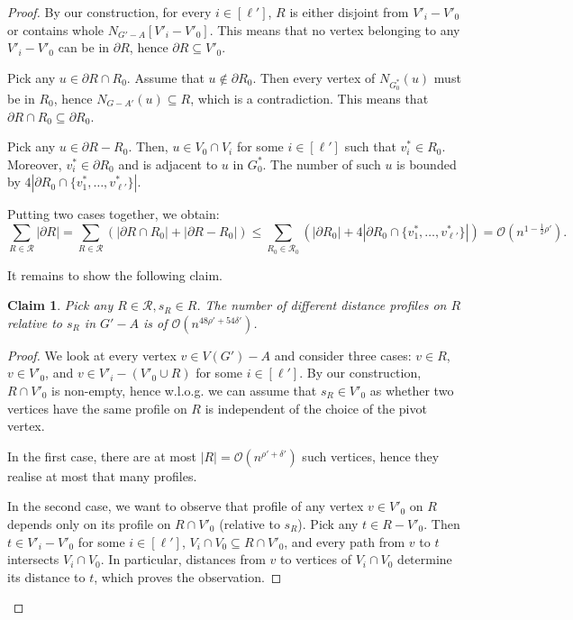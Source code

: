 \documentclass[11pt,a4paper]{article}
\newtheorem{claim}{Claim}[section]
\newcommand{\Oh}{\mathcal{O}}
\renewcommand{\leq}{\leqslant}
\renewcommand{\setminus}{-}
\begin{document}
\begin{proof}
By our construction, for every $i \in [\ell']$, $R$ is either disjoint from $V'_i - V'_0$ or contains whole $N_{G' - A}[V'_i - V'_0]$. This means that no vertex belonging to any $V'_i - V'_0$ can be in $\partial R$, hence $\partial R \subseteq V'_0$.

Pick any $u \in \partial R \cap R_0$. Assume that $u \not\in \partial R_0$. Then every vertex of $N_{G_0^*}(u)$ must be in $R_0$, hence $N_{G - A'}(u) \subseteq R$, which is a contradiction. This means that $\partial R \cap R_0 \subseteq \partial R_0$.

Pick any $u \in \partial R - R_0$. Then, $u \in V_0 \cap V_i$ for some $i \in [\ell']$ such that $v_i^* \in R_0$. Moreover, $v_i^* \in \partial R_0$ and is adjacent to $u$ in $G_0^*$. The number of such $u$ is bounded by $4 |\partial R_0 \cap \{ v_1^*, \dots, v_{\ell'}^* \}|$.

Putting two cases together, we obtain:
$$
\sum_{R \in \mathcal{R}} |\partial R| = \sum_{R \in \mathcal{R}} \left(|\partial R \cap R_0| + |\partial R - R_0|\right) \leq \sum_{R_0 \in \mathcal{R}_0} \left(|\partial R_0| + 4 |\partial R_0 \cap \{ v_1^*, \dots, v_{\ell'}^* \}|\right) = \Oh(n^{1 - \frac{1}{2}\rho'}).
$$

It remains to show the following claim.

\begin{claim}
Pick any $R \in \mathcal{R}, s_R \in R$. The number of different distance profiles on $R$ relative to $s_R$ in $G' - A$ is of $\Oh(n^{48\rho' + 54\delta'})$.
\end{claim}
\begin{proof}
We look at every vertex $v \in V(G') \setminus A$ and consider three cases: $v \in R$, $v \in V'_0$, and $v \in V'_i \setminus (V'_0 \cup R)$ for some $i \in [\ell']$. By our construction, $R \cap V'_0$ is non-empty, hence w.l.o.g. we can assume that $s_R \in V'_0$ as whether two vertices have the same profile on $R$ is independent of the choice of the pivot vertex.

In the first case, there are at most $|R| = \Oh(n^{\rho' + \delta'})$ such vertices, hence they realise at most that many profiles.

In the second case, we want to observe that profile of any vertex $v \in V'_0$ on $R$ depends only on its profile on $R \cap V'_0$ (relative to $s_R$). Pick any $t \in R - V'_0$. Then $t \in V'_i - V'_0$ for some $i \in [\ell']$, $V_i \cap V_0 \subseteq R \cap V'_0$, and every path from $v$ to $t$ intersects $V_i \cap V_0$. In particular, distances from $v$ to vertices of $V_i \cap V_0$ determine its distance to $t$, which proves the observation.


\end{proof}
\end{proof}
\end{document}
